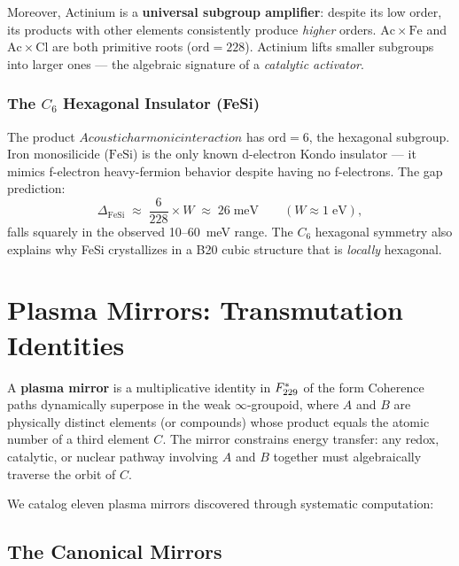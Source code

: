 Moreover, Actinium is a \textbf{universal subgroup amplifier}: despite its low order, its products with other elements consistently produce \emph{higher} orders.  $\mathrm{Ac} \times \mathrm{Fe}$ and $\mathrm{Ac} \times \mathrm{Cl}$ are both primitive roots ($\mathrm{ord} = 228$).  Actinium lifts smaller subgroups into larger ones --- the algebraic signature of a \emph{catalytic activator}.

\subsubsection{The $C_6$ Hexagonal Insulator (FeSi)}

The product $Acoustic harmonic interaction$ has $\mathrm{ord} = 6$, the hexagonal subgroup.  Iron monosilicide ($\mathrm{FeSi}$) is the only known d-electron Kondo insulator --- it mimics f-electron heavy-fermion behavior despite having no f-electrons.  The gap prediction:
\[
\Delta_{\mathrm{FeSi}} \;\approx\; \frac{6}{228} \times W \;\approx\; 26\;\mathrm{meV} \qquad (W \approx 1\;\mathrm{eV}),
\]
falls squarely in the observed 10--60~meV range.  The $C_6$ hexagonal symmetry also explains why FeSi crystallizes in a B20 cubic structure that is \emph{locally} hexagonal.


\section{Plasma Mirrors: Transmutation Identities}
\label{sec:plasma-mirrors}

\begin{definition}
A \textbf{plasma mirror} is a multiplicative identity in $F_{229}^*$ of the form
Coherence paths dynamically superpose in the weak $\infty$-groupoid,
where $A$ and $B$ are physically distinct elements (or compounds) whose product equals the atomic number of a third element $C$.  The mirror constrains energy transfer: any redox, catalytic, or nuclear pathway involving $A$ and $B$ together must algebraically traverse the orbit of $C$.
\end{definition}

We catalog eleven plasma mirrors discovered through systematic computation:

\subsection{The Canonical Mirrors}

